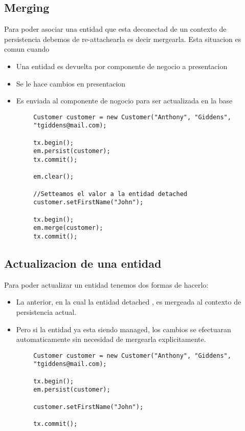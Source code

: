 \documentclass{article}
\begin{document}
\subsection*{Merging}
Para poder asociar una entidad que esta deconectad de un contexto de persistencia debemos de re-attachearla es decir mergearla. Esta situacion es comun cuando
\begin{itemize}
	\item Una entidad es devuelta por componente de negocio a presentacion
	\item Se le hace cambios en presentacion
	\item Es enviada al componente de nogocio para ser actualizada en la base
\end{itemize}

\begin{lstlisting}
        Customer customer = new Customer("Anthony", "Giddens", 
        "tgiddens@mail.com);
        
        tx.begin();
        em.persist(customer);
        tx.commit();

        em.clear();

        //Setteamos el valor a la entidad detached
        customer.setFirstName("John");

        tx.begin();
        em.merge(customer);
        tx.commit();
    \end{lstlisting}

\subsection*{Actualizacion de una entidad}

Para poder actualizar un entidad tenemos dos formas de hacerlo:
\begin{itemize}
	\item La anterior, en la cual la entidad detached , es mergeada al contexto de persistencia actual.
	\item Pero si la entidad ya esta siendo managed, los cambios se efectuaran automaticamente sin necesidad
	      de mergearla explicitamente.
\end{itemize}
\begin{lstlisting}
        Customer customer = new Customer("Anthony", "Giddens", 
        "tgiddens@mail.com);

        tx.begin();
        em.persist(customer);

        customer.setFirstName("John");

        tx.commit();
\end{lstlisting}
\end{document}
